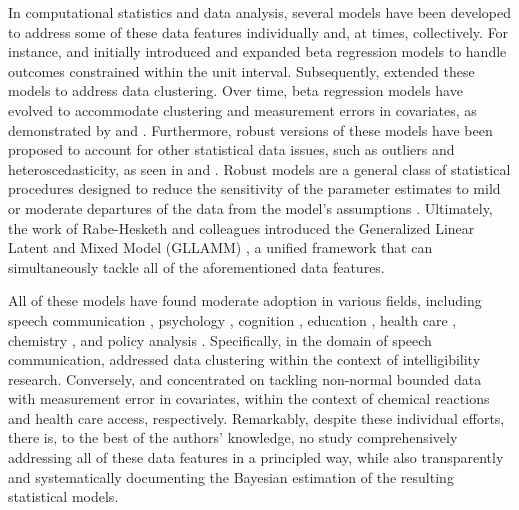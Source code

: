 \documentclass[
  authoryear,
  preprint,
  1p]{elsarticle}
\begin{document}
In computational statistics and data analysis, several models have been
developed to address some of these data features individually and, at
times, collectively. For instance, \citet{Ferrari_et_al_2004} and
\citet{Simas_et_al_2010} initially introduced and expanded beta
regression models to handle outcomes constrained within the unit
interval. Subsequently, \citet{Figueroa-Zuniga_et_al_2013} extended
these models to address data clustering. Over time, beta regression
models have evolved to accommodate clustering and measurement errors in
covariates, as demonstrated by \citet{Carrasco_et_al_2012} and
\citet{Figueroa-Zuniga_et_al_2018}. Furthermore, robust versions of
these models have been proposed to account for other statistical data
issues, such as outliers and heteroscedasticity, as seen in
\citet{Bayes_et_al_2012} and \citet{Figueroa-Zuniga_et_al_2021}. Robust
models are a general class of statistical procedures designed to reduce
the sensitivity of the parameter estimates to mild or moderate
departures of the data from the model's assumptions
\citep{Everitt_et_al_2010}. Ultimately, the work of Rabe-Hesketh and
colleagues introduced the Generalized Linear Latent and Mixed Model
(GLLAMM)
\citep{Rabe_et_al_2004a, Rabe_et_al_2004b, Rabe_et_al_2004c, Skrondal_et_al_2004a},
a unified framework that can simultaneously tackle all of the
aforementioned data features.

All of these models have found moderate adoption in various fields,
including speech communication \citep{Boonen_et_al_2023}, psychology
\citep{Unlu_et_al_2017}, cognition
\citep{Verkuilen_et_al_2012, Lopes_et_al_2023}, education
\citep{Pereira_et_al_2020}, health care
\citep{Ghosh_2019, Kangmennaang_et_al_2023}, chemistry
\citep{de_Brito_et_al_2021}, and policy analysis
\citep{Dieteren_et_al_2023, Choi_2023, Zhang_et_al_2023}. Specifically,
in the domain of speech communication, \citet{Boonen_et_al_2023}
addressed data clustering within the context of intelligibility
research. Conversely, \citet{de_Brito_et_al_2021} and
\citet{Kangmennaang_et_al_2023} concentrated on tackling non-normal
bounded data with measurement error in covariates, within the context of
chemical reactions and health care access, respectively. Remarkably,
despite these individual efforts, there is, to the best of the authors'
knowledge, no study comprehensively addressing all of these data
features in a principled way, while also transparently and
systematically documenting the Bayesian estimation of the resulting
statistical models.
\end{document}
